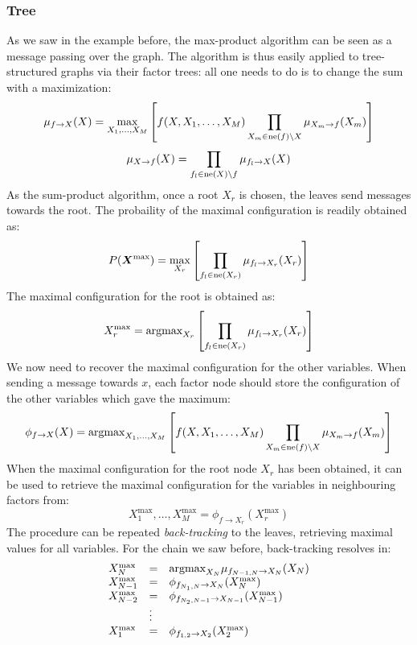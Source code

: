 \subsubsection{Tree}
As we saw in the example before, the max-product algorithm can be seen as a message passing over the graph. The algorithm is thus easily applied to tree-structured graphs via their factor trees: all one needs to do is to change the sum with a maximization:
\[\mu_{f\rightarrow X}(X)=\max\limits_{X_1,\hdots,X_M}\left[f(X, X_1, \hdots, X_M)\displaystyle\prod_{X_m\in\text{ne}(f)\setminus X}\mu_{X_m\rightarrow f}(X_m)\right]\]
\[\mu_{X\rightarrow f}(X)=\displaystyle\prod_{f_l\in\text{ne}(X)\setminus f}\mu_{f_l\rightarrow X}(X)\]
As the sum-product algorithm, once a root $X_r$ is chosen, the leaves send messages towards the root. The probaility of the maximal configuration is readily obtained as:
\[P(\bm{X}^{\text{max}})=\max\limits_{X_r}\left[\displaystyle\prod_{f_l\in\text{ne}(X_r)}\mu_{f_l\rightarrow X_r}(X_r)\right]\]
The maximal configuration for the root is obtained as:
\[X_r^{\text{max}}=\text{argmax}_{X_r}\left[\displaystyle\prod_{f_l\in\text{ne}(X_r)}\mu_{f_l\rightarrow X_r}(X_r)\right]\]
We now need to recover the maximal configuration for the other variables. When sending a message towards $x$, each factor node should store the configuration of the other variables which gave the maximum:
\[\phi_{f\rightarrow X}(X)=\text{argmax}_{X_1,\hdots, X_M}\left[f(X,X_1,\hdots,X_M)\displaystyle\prod_{X_m\in\text{ne}(f)\setminus X}\mu_{X_m\rightarrow f}(X_m)\right]\]
When the maximal configuration for the root node $X_r$ has been obtained, it can be used to retrieve the maximal configuration for the variables in neighbouring factors from:
\[X_1^{\text{max}},\hdots,X_M^{\text{max}}=\phi_{f\rightarrow X_r}\left(X_r^{\text{max}}\right)\]
The procedure can be repeated \textit{back-tracking} to the leaves, retrieving maximal values for all variables. \newline
For the chain we saw before, back-tracking resolves in:
\[
  \begin{array}{lll}
    X_N^{\text{max}}&=&\text{argmax}_{X_N}\mu_{f_{N-1,N}\rightarrow X_N}(X_N)\\
    X_{N-1}^{\text{max}}&=&\phi_{f_{N_1,N}\rightarrow X_N}(X_{N}^{\text{max}})\\
    X_{N-2}^{\text{max}}&=&\phi_{f_{N_2,N-1}\rightarrow X_{N-1}}(X_{N-1}^{\text{max}})\\
                        &\vdots&\\
    X_{1}^{\text{max}}&=&\phi_{f_{1,2}\rightarrow X_2}(X_{2}^{\text{max}})\\
  \end{array}
\]
%
